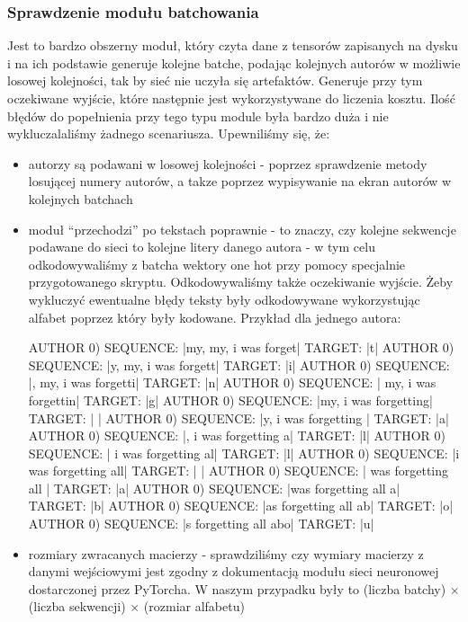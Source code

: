 \subsubsection{Sprawdzenie modułu batchowania}
	  Jest to bardzo obszerny moduł, który czyta dane z tensorów zapisanych na dysku
	  i na ich podstawie generuje kolejne batche, podając kolejnych autorów w możliwie losowej kolejności, tak by sieć
	  nie uczyła się artefaktów. Generuje przy tym oczekiwane wyjście, które następnie jest wykorzystywane do 
	  liczenia kosztu. Ilość błędów do popełnienia przy tego typu module była bardzo duża i nie wykluczalaliśmy
	  żadnego scenariusza. Upewniliśmy się, że:
	\begin{itemize} 
	  \item {autorzy są podawani w losowej kolejności - poprzez sprawdzenie metody losującej numery autorów,
	  a takze poprzez wypisywanie na ekran autorów w kolejnych batchach}
	  \item {moduł ``przechodzi'' po tekstach poprawnie - to znaczy, czy kolejne sekwencje podawane do sieci to 
	  kolejne litery danego autora - w tym celu odkodowywaliśmy z batcha wektory one hot przy pomocy 
	  specjalnie przygotowanego skryptu. Odkodowywaliśmy także oczekiwanie wyjście. Żeby wykluczyć ewentualne błędy
	  teksty były odkodowywane wykorzystując alfabet poprzez który były kodowane.
	  Przykład dla jednego autora:
\begin{bash}
AUTHOR 0) SEQUENCE: |my, my, i was forget|     TARGET: |t|
AUTHOR 0) SEQUENCE: |y, my, i was forgett|     TARGET: |i|
AUTHOR 0) SEQUENCE: |, my, i was forgetti|     TARGET: |n|
AUTHOR 0) SEQUENCE: | my, i was forgettin|     TARGET: |g|
AUTHOR 0) SEQUENCE: |my, i was forgetting|     TARGET: | |
AUTHOR 0) SEQUENCE: |y, i was forgetting |     TARGET: |a|
AUTHOR 0) SEQUENCE: |, i was forgetting a|     TARGET: |l|
AUTHOR 0) SEQUENCE: | i was forgetting al|     TARGET: |l|
AUTHOR 0) SEQUENCE: |i was forgetting all|     TARGET: | |
AUTHOR 0) SEQUENCE: | was forgetting all |     TARGET: |a|
AUTHOR 0) SEQUENCE: |was forgetting all a|     TARGET: |b|
AUTHOR 0) SEQUENCE: |as forgetting all ab|     TARGET: |o|
AUTHOR 0) SEQUENCE: |s forgetting all abo|     TARGET: |u|
\end{bash} }
	  \item {rozmiary zwracanych macierzy - sprawdziliśmy czy wymiary macierzy z danymi wejściowymi jest zgodny 
	  z dokumentacją modułu sieci neuronowej dostarczonej przez PyTorcha. W naszym przypadku były to 
	  (liczba batchy) $\times$ (liczba sekwencji) $\times$ (rozmiar alfabetu) }
	\end{itemize}

